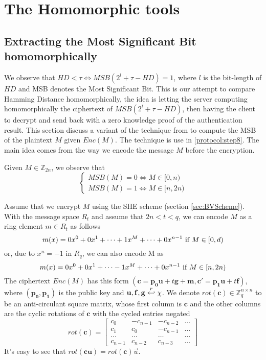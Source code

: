 \section{The Homomorphic tools}
\subsection{Extracting the Most Significant Bit homomorphically}
\label{sec:MSBExtract}
We observe that \(HD < \tau \iff MSB(2^{l} + \tau - HD) = 1\), where \(l\) is
the bit-length of \(HD\) and MSB denotes the Most Significant Bit. This is our
attempt to compare Hamming Distance homomorphically, the idea is letting the
server computing homomorphically the ciphertext of \(MSB(2^{l} + \tau - HD)\),
then having the client to decrypt and send back with a zero knowledge proof of
the authentication result. This section discuss a variant of the technique from
\cite{ducas2015fhew} to compute the MSB of the plaintext $M$ given $Enc(M)$. The
technique is use in \ref{protocol:step8}. The main idea comes from the way we
encode the message $M$ before the encryption.

Given $M \in \mathbb{Z}_{2n}$, we observe that
\[
  \begin{cases}
    MSB(M) = 0 \iff M \in [0, n)\\
    MSB(M) = 1 \iff M \in [n, 2n)
  \end{cases}
\]

Assume that we encrypt $M$ using the SHE scheme (section
\ref{sec:BVScheme}). With the message space $R_t$ and assume that $2n < t < q$,
we can encode $M$ as a ring element $m \in R_t$ as follows
\[
  m(x) = 0x^0 + 0x^1 + \dots + 1x^M + \dots + 0x^{n-1}
  \ \textnormal{if} \ M \in [0,d)
\]
or, due to $x^n = -1$ in $R_q$, we can also encode M as
\[
  m(x) = 0x^0 + 0x^1 + \dots - 1x^M + \dots + 0x^{n-1}
  \ \textnormal{if} \ M \in [n,2n)
\]
The ciphertext $Enc(M)$ has this form
$(\mathbf{c} = \mathbf{p_0}\mathbf{u} + t\mathbf{g} + \mathbf{m}, \mathbf{c'} =
\mathbf{p_1}\mathbf{u} + t\mathbf{f})$, where $(\mathbf{p_0}, \mathbf{p_1})$ is
the public key and $\mathbf{u}, \mathbf{f}, \mathbf{g} \stackrel{r}{\hookleftarrow} \chi$.  We
denote $ rot({\textbf{c}}) \in \mathbb{Z}_q^{n\times n}$ to be an anti-circulant
square matrix, whose first column is $\mathbf{c}$ and the other columns are the
cyclic rotations of $\mathbf{c}$ with the cycled entries negated
\[
  rot({\mathbf{c}})=
  \begin{bmatrix}
    c_0 & -c_{n-1} & -c_{n-2} & \dots\\
    c_1 & c_0 & -c_{n-1} & \dots\\
    \dots & \dots & \dots & \dots\\
    c_{n-1} & c_{n-2} & c_{n-3} & \dots
  \end{bmatrix}
\]
It's easy to see that $rot(\mathbf{c}\mathbf{u}) = rot(\mathbf{c})
\vec{u}$.


